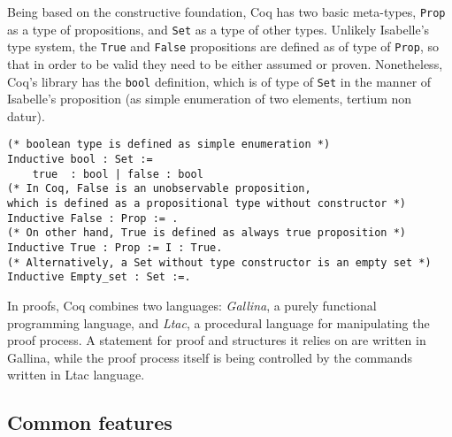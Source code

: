 \documentclass[article]{aaltoseries}
\begin{document}
Being based on the constructive foundation, Coq has two basic meta-types, \texttt{Prop} as a type of propositions, and \texttt{Set} as a type of other types.
Unlikely Isabelle's type system, the \texttt{True} and \texttt{False} propositions are defined as of type of \texttt{Prop}, so that in order to be valid they need to be either assumed or proven. Nonetheless, Coq's library has the \texttt{bool} definition, which is of type of \texttt{Set} in the manner of Isabelle's proposition (as simple enumeration of two elements, tertium non datur).

\begin{lstlisting}[language=coq,
    caption={Basic types definitions in Coq},
    label={ex_typedefs_coq}]
(* boolean type is defined as simple enumeration *)
Inductive bool : Set :=
    true  : bool | false : bool
(* In Coq, False is an unobservable proposition,
which is defined as a propositional type without constructor *)
Inductive False : Prop := .
(* On other hand, True is defined as always true proposition *)
Inductive True : Prop := I : True.
(* Alternatively, a Set without type constructor is an empty set *)
Inductive Empty_set : Set :=.
\end{lstlisting}

In proofs, Coq combines two languages: \textit{Gallina}, a purely functional programming language, and \textit{Ltac}, a procedural language for manipulating the proof process. A statement for proof and structures it relies on are written in Gallina, while the proof process itself is being controlled by the commands written in Ltac language.




\subsection{Common features}
\end{document}
